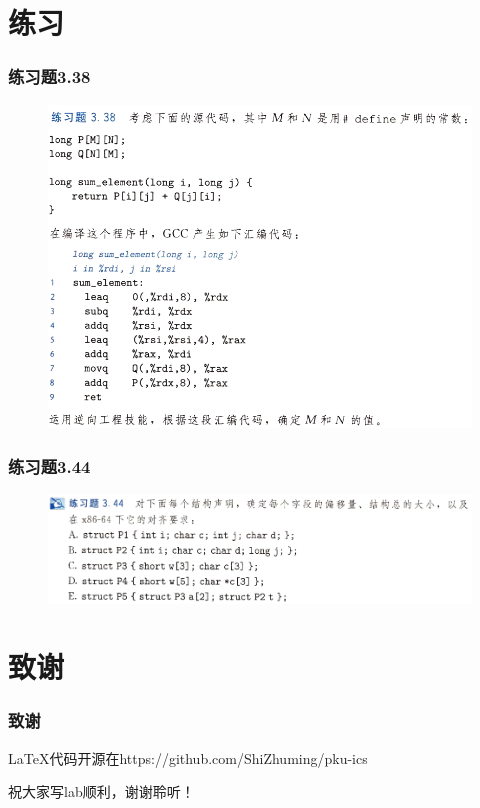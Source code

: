 \documentclass[12pt,AutoFakeBold,aspectratio=169,mathserif]{beamer}
\begin{document}
    \section{练习}

    \begin{frame}
        \frametitle{练习题3.38}
    
        \begin{figure}
            \includegraphics[width=.7\textwidth]{figures/338.png}
        \end{figure}
    
    \end{frame}

    \begin{frame}
        \frametitle{练习题3.44}
    
        \begin{figure}
            \includegraphics[width=.8\textwidth]{figures/344.png}
        \end{figure}
    
    \end{frame}

    \section*{致谢}

    \begin{frame}
        \frametitle{致谢}
        LaTeX代码开源在https://github.com/ShiZhuming/pku-ics

        祝大家写lab顺利，谢谢聆听！
    
    \end{frame}
    
\end{document}
